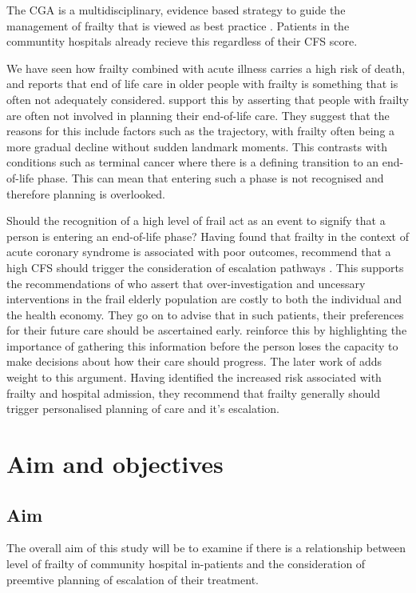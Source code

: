 \documentclass
[
	12pt,
	a4paper,
	oneside,
]{article}
\begin{document}
The CGA is a multidisciplinary, evidence based strategy to guide the management 
of frailty that is viewed as best practice \parencite{silver:12, bgs:14, oliver:14}. Patients
in the communtity hospitals already recieve this regardless of their CFS score.

We have seen how frailty combined with acute illness carries a high risk of death, and 
\textcite{silver:12} reports that end of life care in older people with frailty
is something that is often not adequately considered. \textcite{oliver:14} support this
by asserting that people with frailty are often not involved in planning their 
end-of-life care. They suggest that the reasons for this include factors such as
the trajectory, with frailty often being a more gradual decline without sudden 
landmark moments. This contrasts with conditions such as terminal cancer where there 
is a defining transition to an end-of-life phase. This can mean that entering such a
phase is not recognised and therefore planning is overlooked. 

Should the recognition of a high level of frail act as an event to signify
that a person is entering an end-of-life phase? Having found that frailty in the 
context of acute coronary syndrome is associated
with poor outcomes, \textcite{kang:15} recommend that a high CFS should
trigger the consideration of escalation pathways \parencite{kang:15}.
This supports the recommendations of \textcite{silver:12} who assert that over-investigation
and uncessary interventions in the frail elderly population are costly to both the
individual and the health economy. They go on to advise that in such patients, 
their preferences for their future care should be ascertained early. \textcite{oliver:14} 
reinforce this by highlighting the importance of gathering this information
before the person loses the capacity to make decisions about how their care should
progress. The later work of \textcite{romero-ortuno:16} adds weight to this argument.
Having identified the increased risk associated with frailty and hospital admission, 
they recommend that frailty generally should trigger personalised planning of
care and it's escalation.

\section{Aim and objectives}

\subsection{Aim}
The overall aim of this study will be to examine if there is a relationship between
level of frailty of community hospital in-patients and the consideration of preemtive 
planning of escalation of their treatment.
\end{document}

